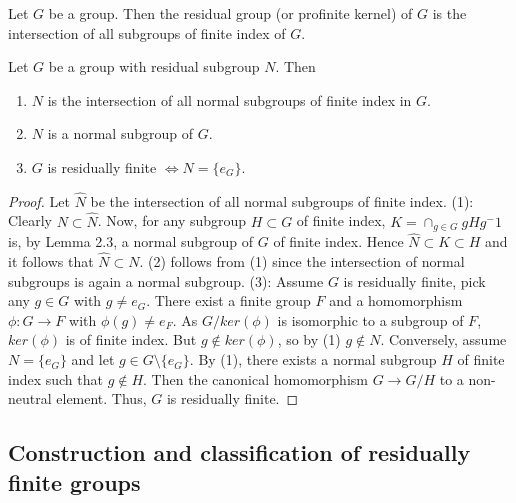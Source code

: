 \begin{definition}
Let $G$ be a group. Then the residual group (or profinite kernel) of $G$ is the intersection of all subgroups of finite index of $G$.
\end{definition}

\begin{proposition}
Let $G$ be a group with residual subgroup $N$. Then 
\begin{enumerate}
\item $N$ is the intersection of all normal subgroups of finite index in $G$.
\item $N$ is a normal subgroup of $G$.
\item $G$ is residually finite $\Leftrightarrow N = \{e_G\}$.
\end{enumerate}
\end{proposition}

\begin{proof}
Let $\hat{N}$ be the intersection of all normal subgroups of finite index. \newline
(1): Clearly $N \subset \hat{N}$. Now, for any subgroup $H \subset G$ of finite index, $K = \cap_{g \in G} gHg^-1$ is, by Lemma 2.3, a normal subgroup of $G$ of finite index. Hence $\hat{N} \subset K \subset H$ and it follows that $\hat{N} \subset N$. \newline
(2) follows from (1) since the intersection of normal subgroups is again a normal subgroup. \newline
(3): Assume $G$ is residually finite, pick any $g \in G$ with $g \neq e_G$. There exist a finite group $F$ and a homomorphism $\phi: G \rightarrow F$ with $\phi(g) \neq e_F$. As $G/ker(\phi)$ is isomorphic to a subgroup of $F$, $ker(\phi)$ is of finite index. But $g \not \in ker(\phi)$, so by (1) $g \not \in N$. \newline
Conversely, assume $N = \{ e_G \}$ and let $g \in G \setminus \{e_G \}$. By (1), there exists a normal subgroup $H$ of finite index such that $g \not \in H$. Then the canonical homomorphism $G \rightarrow G/H$ to a non-neutral element. Thus, $G$ is residually finite.
\end{proof}


\subsection{Construction and classification of residually finite groups} \hfill\\



